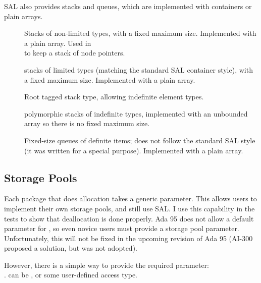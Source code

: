 \documentclass{article}
\begin{document}
SAL also provides stacks and queues, which are implemented with
containers or plain arrays.
\begin{description}
\item [] Stacks of
  non-limited types, with a fixed maximum size. Implemented with a
  plain array. Used in \\ 
  to keep a stack of node pointers.

\item [] stacks of limited
  types (matching the standard SAL container style), with a fixed
  maximum size. Implemented with a plain array.

\item [] Root tagged stack type, allowing
      indefinite element types. 

\item [] polymorphic stacks of
      indefinite types, implemented with an unbounded array so there
      is no fixed maximum size.

\item [] Fixed-size
  queues of definite items; does not follow the standard SAL style (it
  was written for a special purpose). Implemented with a plain array.

\end{description}

\subsection{Storage Pools}
Each package that does allocation takes a generic 
parameter. This allows users to implement their own storage pools, and
still use SAL. I use this capability in the tests to show that
deallocation is done properly. Ada 95 does not allow a default
parameter for , so even novice users must provide a
storage pool parameter. Unfortunately, this will not be fixed in the
upcoming revision of Ada 95 (AI-300 proposed a solution, but was not
adopted).

However, there is a simple way to provide the required parameter: \\
.
 can be
, or some user-defined
access type.
      
\end{document}
